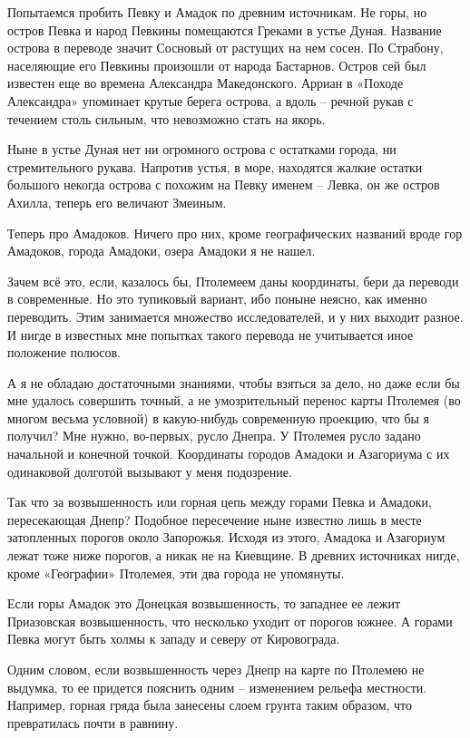 Попытаемся пробить Певку и Амадок по древним источникам. Не горы, но остров Певка и народ Певкины помещаются Греками в устье Дуная. Название острова в переводе значит Сосновый от растущих на нем сосен. По Страбону, населяющие его Певкины произошли от народа Бастарнов. Остров сей был известен еще во времена Александра Македонского. Арриан в «Походе Александра» упоминает крутые берега острова, а вдоль – речной рукав с течением столь сильным, что невозможно стать на якорь.

Ныне в устье Дуная нет ни огромного острова с остатками города, ни стремительного рукава. Напротив устья, в море, находятся жалкие остатки большого некогда острова с похожим на Певку именем – Левка, он же остров Ахилла, теперь его величают Змеиным.

Теперь про Амадоков. Ничего про них, кроме географических названий вроде гор Амадоков, города Амадоки, озера Амадоки я не нашел.

Зачем всё это, если, казалось бы, Птолемеем даны координаты, бери да переводи в современные. Но это тупиковый вариант, ибо поныне неясно, как именно переводить. Этим занимается множество исследователей, и у них выходит разное. И нигде в известных мне попытках такого перевода не учитывается иное положение полюсов. 

А я не обладаю достаточными знаниями, чтобы взяться за дело, но даже если бы мне удалось совершить точный, а не умозрительный перенос карты Птолемея (во многом весьма условной) в какую-нибудь современную проекцию, что бы я получил? Мне нужно, во-первых, русло Днепра. У Птолемея русло задано начальной и конечной точкой. Координаты городов Амадоки и Азагориума с их одинаковой долготой вызывают у меня подозрение. 

Так что за возвышенность или горная цепь между горами Певка и Амадоки, пересекающая Днепр? Подобное пересечение ныне известно лишь в месте затопленных порогов около Запорожья. Исходя из этого, Амадока и Азагориум лежат тоже ниже порогов, а никак не на Киевщине. В древних источниках нигде, кроме «Географии» Птолемея, эти два города не упомянуты.

Если горы Амадок это Донецкая возвышенность, то западнее ее лежит Приазовская возвышенность, что несколько уходит от порогов южнее. А горами Певка могут быть холмы к западу и северу от Кировограда.

Одним словом, если возвышенность через Днепр на карте по Птолемею не выдумка, то ее придется пояснить одним – изменением рельефа местности. Например, горная гряда была занесены слоем грунта таким образом, что превратилась почти в равнину.

